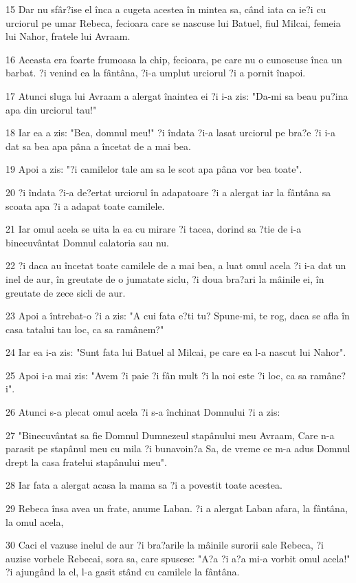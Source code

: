 \par 15 Dar nu sfâr?ise el înca a cugeta acestea în mintea sa, când iata ca ie?i cu urciorul pe umar Rebeca, fecioara care se nascuse lui Batuel, fiul Milcai, femeia lui Nahor, fratele lui Avraam.
\par 16 Aceasta era foarte frumoasa la chip, fecioara, pe care nu o cunoscuse înca un barbat. ?i venind ea la fântâna, ?i-a umplut urciorul ?i a pornit înapoi.
\par 17 Atunci sluga lui Avraam a alergat înaintea ei ?i i-a zis: "Da-mi sa beau pu?ina apa din urciorul tau!"
\par 18 Iar ea a zis: "Bea, domnul meu!" ?i îndata ?i-a lasat urciorul pe bra?e ?i i-a dat sa bea apa pâna a încetat de a mai bea.
\par 19 Apoi a zis: "?i camilelor tale am sa le scot apa pâna vor bea toate".
\par 20 ?i îndata ?i-a de?ertat urciorul în adapatoare ?i a alergat iar la fântâna sa scoata apa ?i a adapat toate camilele.
\par 21 Iar omul acela se uita la ea cu mirare ?i tacea, dorind sa ?tie de i-a binecuvântat Domnul calatoria sau nu.
\par 22 ?i daca au încetat toate camilele de a mai bea, a luat omul acela ?i i-a dat un inel de aur, în greutate de o jumatate siclu, ?i doua bra?ari la mâinile ei, în greutate de zece sicli de aur.
\par 23 Apoi a întrebat-o ?i a zis: "A cui fata e?ti tu? Spune-mi, te rog, daca se afla în casa tatalui tau loc, ca sa ramânem?"
\par 24 Iar ea i-a zis: "Sunt fata lui Batuel al Milcai, pe care ea l-a nascut lui Nahor".
\par 25 Apoi i-a mai zis: "Avem ?i paie ?i fân mult ?i la noi este ?i loc, ca sa ramâne?i".
\par 26 Atunci s-a plecat omul acela ?i s-a închinat Domnului ?i a zis:
\par 27 "Binecuvântat sa fie Domnul Dumnezeul stapânului meu Avraam, Care n-a parasit pe stapânul meu cu mila ?i bunavoin?a Sa, de vreme ce m-a adus Domnul drept la casa fratelui stapânului meu".
\par 28 Iar fata a alergat acasa la mama sa ?i a povestit toate acestea.
\par 29 Rebeca însa avea un frate, anume Laban. ?i a alergat Laban afara, la fântâna, la omul acela,
\par 30 Caci el vazuse inelul de aur ?i bra?arile la mâinile surorii sale Rebeca, ?i auzise vorbele Rebecai, sora sa, care spusese: "A?a ?i a?a mi-a vorbit omul acela!" ?i ajungând la el, l-a gasit stând cu camilele la fântâna.
